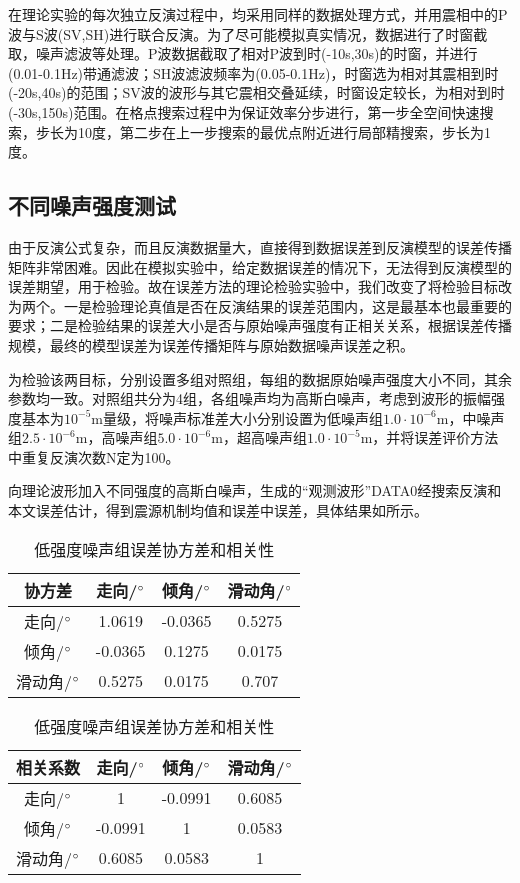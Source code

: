 在理论实验的每次独立反演过程中，均采用同样的数据处理方式，并用震相中的P波与S波(SV,SH)进行联合反演。为了尽可能模拟真实情况，数据进行了时窗截取，噪声滤波等处理。P波数据截取了相对P波到时(-10s,30s)的时窗，并进行(0.01-0.1Hz)带通滤波；SH波滤波频率为(0.05-0.1Hz)，时窗选为相对其震相到时(-20s,40s)的范围；SV波的波形与其它震相交叠延续，时窗设定较长，为相对到时(-30s,150s)范围。在格点搜索过程中为保证效率分步进行，第一步全空间快速搜索，步长为10度，第二步在上一步搜索的最优点附近进行局部精搜索，步长为1度。

\subsection{不同噪声强度测试}
由于反演公式复杂，而且反演数据量大，直接得到数据误差到反演模型的误差传播矩阵非常困难。因此在模拟实验中，给定数据误差的情况下，无法得到反演模型的误差期望，用于检验。故在误差方法的理论检验实验中，我们改变了将检验目标改为两个。一是检验理论真值是否在反演结果的误差范围内，这是最基本也最重要的要求；二是检验结果的误差大小是否与原始噪声强度有正相关关系，根据误差传播规模，最终的模型误差为误差传播矩阵与原始数据噪声误差之积。

为检验该两目标，分别设置多组对照组，每组的数据原始噪声强度大小不同，其余参数均一致。对照组共分为4组，各组噪声均为高斯白噪声，考虑到波形的振幅强度基本为$10^{-5}$m量级，将噪声标准差大小分别设置为低噪声组$1.0\cdot10^{-6}$m，中噪声组$2.5\cdot10^{-6}$m，高噪声组$5.0\cdot10^{-6}$m，超高噪声组$1.0\cdot10^{-5}$m，并将误差评价方法中重复反演次数N定为100。

向理论波形加入不同强度的高斯白噪声，生成的“观测波形”DATA0经搜索反演和本文误差估计，得到震源机制均值和误差中误差，具体结果如所示。
\begin{table}[ht]
\centering
\caption{低强度噪声组误差协方差和相关性}
\label{tab3_02}
    \begin{tabular}{c c c c}
    \hline
    协方差 & 走向/$^\circ$ & 倾角/$^\circ$ & 滑动角/$^\circ$ \\
    \hline
	走向/$^\circ$ 		&1.0619 	&-0.0365	&0.5275\\
	倾角/$^\circ$		&-0.0365	&0.1275		&0.0175\\
	滑动角/$^\circ$	&0.5275		&0.0175		&0.707\\
    \hline
    \end{tabular}
    \begin{tabular}{c c c c}
    \hline
    相关系数 & 走向/$^\circ$ & 倾角/$^\circ$ & 滑动角/$^\circ$ \\
    \hline
	走向/$^\circ$ 		&1 			&-0.0991	&0.6085\\
	倾角/$^\circ$		&-0.0991	&1			&0.0583\\
	滑动角/$^\circ$	&0.6085		&0.0583		&1\\
    \hline
    \end{tabular}
\end{table}

